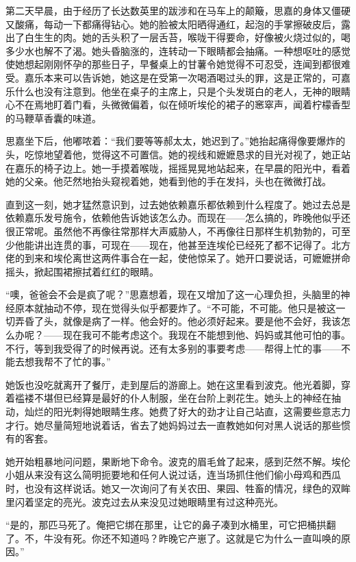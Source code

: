 \par 第二天早晨，由于经历了长达数英里的跋涉和在马车上的颠簸，思嘉的身体又僵硬又酸痛，每动一下都痛得钻心。她的脸被太阳晒得通红，起泡的手掌擦破皮后，露出了白生生的肉。她的舌头积了一层舌苔，喉咙干得要命，好像被火烧过似的，喝多少水也解不了渴。她头昏脑涨的，连转动一下眼睛都会抽痛。一种想呕吐的感觉使她想起刚刚怀孕的那些日子，早餐桌上的甘薯令她觉得不可忍受，连闻到都很难受。嘉乐本来可以告诉她，她这是在受第一次喝酒喝过头的罪，这是正常的，可嘉乐什么也没有注意到。他坐在桌子的主席上，只是个头发斑白的老人，无神的眼睛心不在焉地盯着门看，头微微偏着，似在倾听埃伦的裙子的窸窣声，闻着柠檬香型的马鞭草香囊的味道。
\par 思嘉坐下后，他嘟哝着：“我们要等等郝太太，她迟到了。”她抬起痛得像要爆炸的头，吃惊地望着他，觉得这不可置信。她的视线和嬷嬷恳求的目光对视了，她正站在嘉乐的椅子边上。她一手摸着喉咙，摇摇晃晃地站起来，在早晨的阳光中，看着她的父亲。他茫然地抬头窥视着她，她看到他的手在发抖，头也在微微打战。
\par 直到这一刻，她才猛然意识到，过去她依赖嘉乐都依赖到什么程度了。她过去总是依赖嘉乐发号施令，依赖他告诉她该怎么办。而现在——怎么搞的，昨晚他似乎还很正常呢。虽然他不再像往常那样大声威胁人，不再像往日那样生机勃勃的，可至少他能讲出连贯的事，可现在——现在，他甚至连埃伦已经死了都不记得了。北方佬的到来和埃伦离世这两件事合在一起，使他惊呆了。她开口要说话，可嬷嬷拼命摇头，掀起围裙擦拭着红红的眼睛。
\par “噢，爸爸会不会是疯了呢？”思嘉想着，现在又增加了这一心理负担，头脑里的神经原本就抽动不停，现在觉得头似乎都要炸了。“不可能，不可能。他只是被这一切弄昏了头，就像是病了一样。他会好的。他必须好起来。要是他不会好，我该怎么办呢？——现在我可不能考虑这个。我现在不能想到他、妈妈或其他可怕的事。不行，等到我受得了的时候再说。还有太多别的事要考虑——帮得上忙的事——不能去想我帮不了忙的事。”
\par 她饭也没吃就离开了餐厅，走到屋后的游廊上。她在这里看到波克。他光着脚，穿着褴褛不堪但已经算是最好的仆人制服，坐在台阶上剥花生。她头上的神经在抽动，灿烂的阳光刺得她眼睛生疼。她费了好大的劲才让自己站直，这需要些意志力才行。她尽量简短地说着话，省去了她妈妈过去一直教她如何对黑人说话的那些惯有的客套。
\par 她开始粗暴地问问题，果断地下命令。波克的眉毛耸了起来，感到茫然不解。埃伦小姐从来没有这么简明扼要地和任何人说过话，连当场抓住他们偷小母鸡和西瓜时，也没有这样说话。她又一次询问了有关农田、果园、牲畜的情况，绿色的双眸里闪着坚定的亮光。波克过去从来没见过她眼睛里有过这种亮光。
\par “是的，那匹马死了。俺把它绑在那里，让它的鼻子凑到水桶里，可它把桶拱翻了。不，牛没有死。你还不知道吗？昨晚它产崽了。这就是它为什么一直叫唤的原因。”
